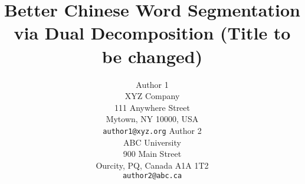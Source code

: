 \documentclass[11pt,letterpaper]{article}
\title{Better Chinese Word Segmentation via Dual Decomposition (Title to be changed)}
\author{Author 1\\
	    XYZ Company\\
	    111 Anywhere Street\\
	    Mytown, NY 10000, USA\\
	    {\tt author1@xyz.org}
	  \And
	Author 2\\
  	ABC University\\
  	900 Main Street\\
  	Ourcity, PQ, Canada A1A 1T2\\
  {\tt author2@abc.ca}}
\begin{document}
\maketitle

 
 \label{sec:intro}
 \label{sec:models}
 \label{sec:dual-decomp}
 \label{sec:experiment}
 \label{sec:results}
 \label{sec:discussion}
 \label{sec:relatedwork}
 \label{sec:conclusion}




\end{document}
